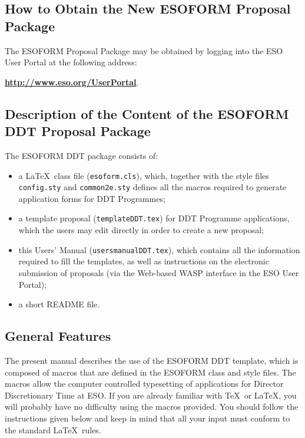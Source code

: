 \documentclass{article}
\begin{document}
\subsection{How to Obtain the {\bf New ESOFORM} Proposal Package}

The ESOFORM Proposal Package may be obtained by logging into the ESO
User Portal at the following address:

\begin{center}
  \href{http://www.eso.org/UserPortal}{\bf
    \underline{http://www.eso.org/UserPortal}}.
\end{center}


\subsection{Description of the Content of the ESOFORM DDT Proposal
  Package}

\noindent The ESOFORM DDT package consists of:
\begin{itemize}  
\item a \LaTeX\ class file ({\tt esoform.cls}), which, 
  together with the style files {\tt config.sty} and {\tt common2e.sty}
  defines all the macros required to generate application forms for DDT Programmes;
\item a template proposal ({\tt  templateDDT.tex}) for DDT 
  Programme applications, 
    which the  users   may  edit directly in  order  to 
    create a new proposal;
\item this Users' Manual ({\tt usersmanualDDT.tex}), which contains all the 
    information  required to fill the templates, as well as
    instructions on the electronic submission of proposals (via the
    Web-based WASP interface in the ESO User Portal);
\item a short README file.
\end{itemize} 


\subsection{General Features}

The present manual describes the use of the ESOFORM DDT template,
which is composed of macros that are defined in the ESOFORM class and
style files. The macros allow the 
computer controlled typesetting of applications for Director 
Discretionary Time at 
ESO.  If you are already familiar with \TeX\ or \LaTeX, you will
probably have no difficulty using the macros provided.  You should
follow the instructions given below and keep in mind that all your
input must conform to the standard \LaTeX\ rules.
\end{document}
